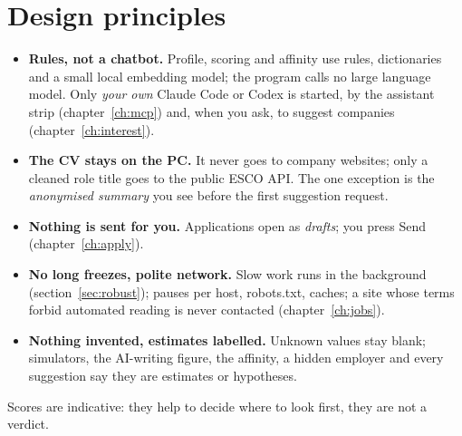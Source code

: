 \section{Design principles}
\begin{itemize}
  \item \textbf{Rules, not a chatbot.} Profile, scoring and affinity use rules, dictionaries and a
        small local embedding model; the program calls no large language model. Only \emph{your own}
        Claude Code or Codex is started, by the assistant strip (chapter~\ref{ch:mcp}) and, when you
        ask, to suggest companies (chapter~\ref{ch:interest}).
  \item \textbf{The CV stays on the PC.} It never goes to company websites; only a cleaned role title
        goes to the public ESCO API. The one exception is the \emph{anonymised summary} you see before
        the first suggestion request.
  \item \textbf{Nothing is sent for you.} Applications open as \emph{drafts}; you press Send (chapter~\ref{ch:apply}).
  \item \textbf{No long freezes, polite network.} Slow work runs in the background (section~\ref{sec:robust});
        pauses per host, robots.txt, caches; a site whose terms forbid automated reading is never contacted (chapter~\ref{ch:jobs}).
  \item \textbf{Nothing invented, estimates labelled.} Unknown values stay blank; simulators, the AI-writing
        figure, the affinity, a hidden employer and every suggestion say they are estimates or hypotheses.
\end{itemize}

\begin{infobox}
Scores are indicative: they help to decide where to look first, they are not a verdict.
\end{infobox}
